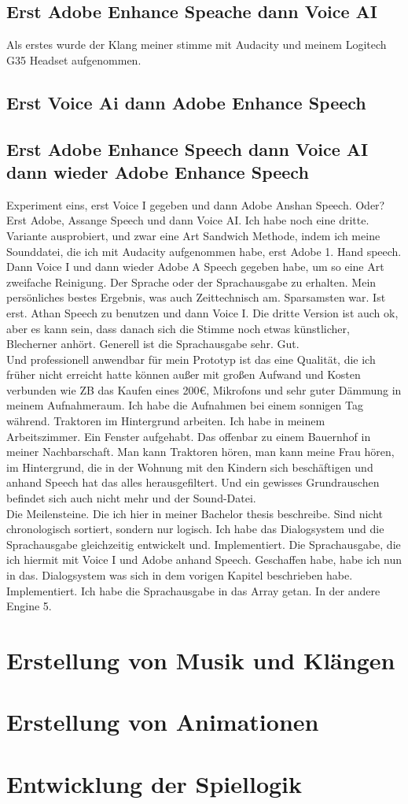\subsection{Erst Adobe Enhance Speache dann Voice AI}
Als erstes wurde der Klang meiner stimme mit Audacity und meinem Logitech G35 Headset aufgenommen.
\subsection{Erst Voice Ai dann Adobe Enhance Speech}
\subsection{Erst Adobe Enhance Speech dann Voice AI dann wieder Adobe Enhance Speech}
 
Experiment eins, erst Voice I gegeben und dann Adobe Anshan Speech. 		 Oder? Erst Adobe, Assange Speech und dann Voice AI.  Ich habe noch eine dritte.
\\
Variante ausprobiert, und zwar eine Art Sandwich Methode, indem ich meine Sounddatei, die ich mit Audacity aufgenommen habe, erst Adobe 1. Hand speech. Dann Voice I und dann wieder Adobe A Speech gegeben habe, um so eine Art zweifache Reinigung. Der Sprache oder der Sprachausgabe zu erhalten.     Mein persönliches bestes Ergebnis, was auch Zeittechnisch am. Sparsamsten war.  Ist erst.  Athan Speech zu benutzen und dann Voice I. Die dritte Version ist auch ok, aber es kann sein, dass danach sich die Stimme noch etwas künstlicher, Blecherner anhört.   Generell ist die Sprachausgabe sehr.  Gut.
\\
Und professionell anwendbar für mein Prototyp ist das eine Qualität, die ich früher nicht erreicht hatte können außer mit großen Aufwand und Kosten verbunden wie ZB das Kaufen eines 200€, Mikrofons und sehr guter Dämmung in meinem Aufnahmeraum. Ich habe die Aufnahmen bei einem sonnigen Tag während. Traktoren im Hintergrund arbeiten. Ich habe in meinem Arbeitszimmer. Ein Fenster aufgehabt. Das offenbar zu einem Bauernhof in meiner Nachbarschaft. Man kann Traktoren hören, man kann meine Frau hören, im Hintergrund, die in der Wohnung mit den Kindern sich beschäftigen und anhand Speech hat das alles herausgefiltert. Und ein gewisses Grundrauschen befindet sich auch nicht mehr und der Sound-Datei.
\\
Die Meilensteine.  Die ich hier in meiner Bachelor thesis beschreibe.  Sind nicht chronologisch sortiert, sondern nur logisch.  Ich habe das Dialogsystem und die Sprachausgabe gleichzeitig entwickelt und.  Implementiert.  Die Sprachausgabe, die ich hiermit mit Voice I und Adobe anhand Speech. Geschaffen habe, habe ich nun in das.  Dialogsystem was sich in dem vorigen Kapitel beschrieben habe. Implementiert. Ich habe die Sprachausgabe in das Array getan.		 In der andere Engine 5.
 
\section{Erstellung von Musik und Klängen}
\section{Erstellung von Animationen}
\section{Entwicklung der Spiellogik}
